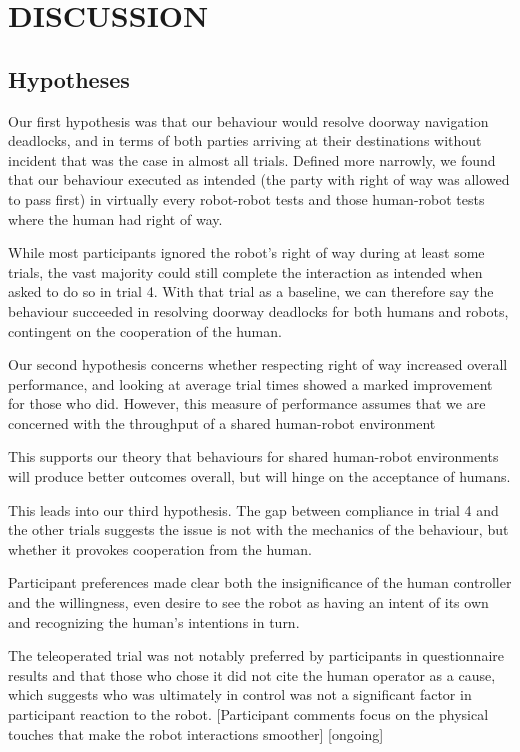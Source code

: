 \documentclass[letterpaper, 10 pt, conference]{ieeeconf}  %
\begin{document}
\section{DISCUSSION}

\subsection{Hypotheses}

Our first hypothesis was that our behaviour would resolve doorway navigation deadlocks, and in terms of both parties arriving at their destinations without incident that was the case in almost all trials. Defined more narrowly, we found that our behaviour executed as intended (the party with right of way was allowed to pass first) in virtually every robot-robot tests and those human-robot tests where the human had right of way. 

While most participants ignored the robot's right of way during at least some trials, the vast majority could still complete the interaction as intended when asked to do so in trial 4. With that trial as a baseline, we can therefore say the behaviour succeeded in resolving doorway deadlocks for both humans and robots, contingent on the cooperation of the human.

Our second hypothesis concerns whether respecting right of way increased overall performance, and looking at average trial times showed a marked improvement for those who did. However, this measure of performance assumes that we are concerned with the throughput of a shared human-robot environment

This supports our theory that behaviours   for shared human-robot environments will produce better outcomes overall, but will hinge on the acceptance of humans.

This leads into our third hypothesis. The gap between compliance in trial 4 and the other trials suggests the issue is not with the mechanics of the behaviour, but whether it provokes cooperation from the human. 

Participant preferences made clear both the insignificance of the human controller and the willingness, even desire to see the robot as having an intent of its own and recognizing the human's intentions in turn.


The teleoperated trial was not notably preferred by participants in questionnaire results and that those who chose it did not cite the human operator as a cause, which suggests who was ultimately in control was not a significant factor in participant reaction to the robot. [Participant comments focus on the physical touches that make the robot interactions smoother] [ongoing]
\end{document}
